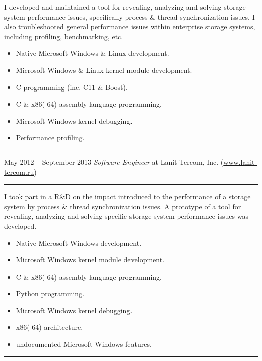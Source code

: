 \documentclass[11pt]{article}
\newcommand\CXX{C\nolinebreak[4]\hspace{-.05em}\raisebox{.4ex}{\relsize{-3}{\textbf{++}}}}
\newcommand\CvSmallSkipLength{0.5em}
\newcommand\CvBigSkipLength{1em}
\newcommand\CvSkip[1]{\vspace{#1}}
\newcommand\CvSmallSkip{\CvSkip{\CvSmallSkipLength}}
\newcommand\CvBigSkip{\CvSkip{\CvBigSkipLength}}
\newcommand\CvSectionHeader[1]{\CvBigSkip\textbf{#1}\CvBigSkip}
\newcommand\CvRule{\begingroup\color{CvRuleColor}\hrule\endgroup}
\newcommand\CvWorkplaceHeader[5]{\begingroup%
  \CvRule\nopagebreak%
  \fboxsep0pt%
  \colorbox{CvWorkplaceHeaderColor}{%
    \begin{minipage}{\linewidth-2\fboxsep}%
\CvSmallSkip%
#1 -- #2 \hfill \textit{#3} at #4 (\href{http://#5/}{#5})%
\CvSmallSkip%
    \end{minipage}%
  }%
  \CvRule%
\endgroup%
}
\newenvironment{CvWorkplaceDescription}{%
    \begingroup\setlength\parskip{\CvSmallSkipLength}%
  }{%
    \CvSmallSkip\endgroup%
  }
\begin{document}
\begin{CvWorkplaceDescription}
I developed and maintained a tool for revealing, analyzing and solving storage
system performance issues, specifically process \& thread synchronization
issues.
I also troubleshooted general performance issues within enterprise storage
systems, including profiling, benchmarking, etc.

\begin{itemize}[noitemsep]
  \item Native Microsoft Windows \& Linux development.
  \item Microsoft Windows \& Linux kernel module development.
  \item {\CXX} programming (inc. {\CXX}11 \& Boost).
  \item C \& x86(-64) assembly language programming.
  \item Microsoft Windows kernel debugging.
  \item Performance profiling.
\end{itemize}
\end{CvWorkplaceDescription}

\CvWorkplaceHeader{May 2012}{September 2013}{Software Engineer}{Lanit-Tercom, Inc.}{www.lanit-tercom.ru}

\begin{CvWorkplaceDescription}
I took part in a R\&D on the impact introduced to the performance of a storage
system by process \& thread synchronization issues.
A prototype of a tool for revealing, analyzing and solving specific storage
system performance issues was developed.

\begin{itemize}[noitemsep]
  \item Native Microsoft Windows development.
  \item Microsoft Windows kernel module development.
  \item C \& x86(-64) assembly language programming.
  \item Python programming.
  \item Microsoft Windows kernel debugging.
  \item x86(-64) architecture.
  \item undocumented Microsoft Windows features.
\end{itemize}
\end{CvWorkplaceDescription}
\CvRule


\end{document}
